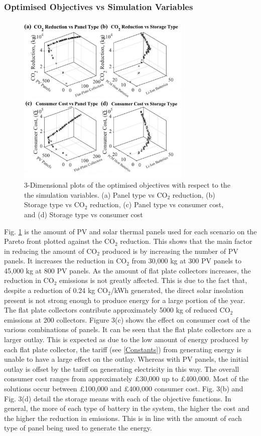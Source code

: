 \subsubsection{Optimised Objectives vs Simulation Variables}

\begin{figure}[H]
	\centering
    \includegraphics[width=235pt]{Figures/RedAndCostVsPanelsAndStorageBase1.jpg}
    \caption{3-Dimensional plots of the optimised objectives with respect to the the simulation variables. (a) Panel type vs CO$_2$ reduction, (b) Storage type vs CO$_2$ reduction, (c) Panel type vs consumer cost, and (d) Storage type vs consumer cost}
    \label{fig:ObjectivesVsPanelsVsStorage}
\end{figure}
  
  Fig. \ref{fig:ObjectivesVsPanelsVsStorage} is the amount of PV and solar thermal panels used for each scenario on the Pareto front plotted against the CO$_2$ reduction. This shows that the main factor in reducing the amount of CO$_2$ produced is by increasing the number of PV panels. It increases the reduction in CO$_2$ from 30,000 kg at 300 PV panels to 45,000 kg at 800 PV panels. As the amount of flat plate collectors increases, the reduction in CO$_2$ emissions is not greatly affected. This is due to the fact that, despite a reduction of 0.24 kg CO$_2$/kWh generated, the direct solar insolation present is not strong enough to produce energy for a large portion of the year. The flat plate collectors contribute approximately 5000 kg of reduced CO$_2$ emissions at 200 collectors. Figure 3(c) shows the effect on consumer cost of the various combinations of panels. It can be seen that the flat plate collectors are a larger outlay. This is expected as due to the low amount of energy produced by each flat plate collector, the tariff (see \ref{Constants}) from generating energy is unable to have a large effect on the outlay. Whereas with PV panels, the initial outlay is offset by the tariff on generating electricity in this way. The overall consumer cost ranges from approximately £30,000 up to £400,000. Most of the solutions occur between £100,000 and £400,000 consumer cost. Fig. 3(b) and Fig. 3(d) detail the storage means with each of the objective functions. In general, the more of each type of battery in the system, the higher the cost and the higher the reduction in emissions. This is in line with the amount of each type of panel being used to generate the energy. 
  
